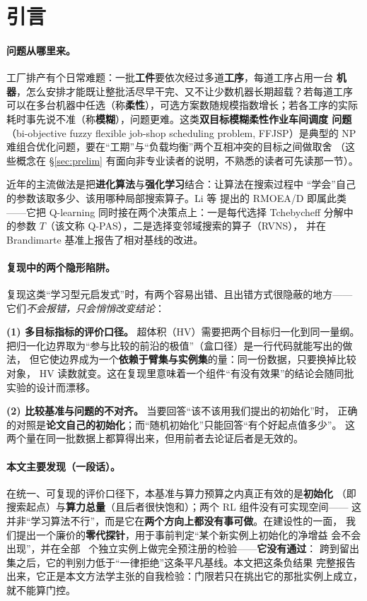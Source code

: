 \documentclass[UTF8, a4paper, 11pt]{ctexart}
\begin{document}
\section{引言}

\paragraph{问题从哪里来。}
工厂排产有个日常难题：一批\textbf{工件}要依次经过多道\textbf{工序}，每道工序占用一台
\textbf{机器}，怎么安排才能既让整批活尽早干完、又不让少数机器长期超载？若每道工序
可以在多台机器中任选（称\textbf{柔性}），可选方案数随规模指数增长；若各工序的实际
耗时事先说不准（称\textbf{模糊}），问题更难。这类\textbf{双目标模糊柔性作业车间调度
问题}（bi-objective fuzzy flexible job-shop scheduling problem, FFJSP）是典型的
NP 难组合优化问题，要在“工期”与“负载均衡”两个互相冲突的目标之间做取舍
（这些概念在 \S\ref{sec:prelim} 有面向非专业读者的说明，不熟悉的读者可先读那一节）。

近年的主流做法是把\textbf{进化算法}与\textbf{强化学习}结合：让算法在搜索过程中
“学会”自己的参数该取多少、该用哪种局部搜索算子。Li 等\cite{li2022rmoead}
提出的 RMOEA/D 即属此类——它把 Q-learning 同时接在两个决策点上：一是每代选择
Tchebycheff 分解中的参数 $T$（该文称 Q-PAS），二是选择变邻域搜索的算子（RVNS），
并在 Brandimarte 基准上报告了相对基线的改进。

\paragraph{复现中的两个隐形陷阱。}
复现这类“学习型元启发式”时，有两个容易出错、且出错方式很隐蔽的地方——
它们\emph{不会报错，只会悄悄改变结论}：

\textbf{(1) 多目标指标的评价口径。} 超体积（HV）需要把两个目标归一化到同一量纲。
把归一化边界取为“参与比较的前沿的极值”（盒口径）是一行代码就能写出的做法，
但它使边界成为一个\textbf{依赖于臂集与实例集}的量：同一份数据，只要换掉比较对象，
HV 读数就变。这在复现里意味着一个组件“有没有效果”的结论会随同批实验的设计而漂移。

\textbf{(2) 比较基准与问题的不对齐。} 当要回答“该不该用我们提出的初始化”时，
正确的对照是\textbf{论文自己的初始化}；而“随机初始化”只能回答“有个好起点值多少”。
这两个量在同一批数据上都算得出来，但用前者去论证后者是无效的。

\paragraph{本文主要发现（一段话）。}
在统一、可复现的评价口径下，本基准与算力预算之内真正有效的是\textbf{初始化}
（即搜索起点）与\textbf{算力总量}（且后者很快饱和）；两个 RL 组件没有可实现空间——
这并非“学习算法不行”，而是它在\textbf{两个方向上都没有事可做}。在建设性的一面，
我们提出一个廉价的\textbf{零代探针}，用于事前判定“某个新实例上初始化的净增益
会不会出现”，并在全部 \HKn\ 个独立实例上做完全预注册的检验——\textbf{它没有通过}：
跨到留出集之后，它的判别力低于“一律拒绝”这条平凡基线。本文把这条负结果
完整报告出来，它正是本文方法学主张的自我检验：门限若只在挑出它的那批实例上成立，
就不能算门控。
\end{document}
